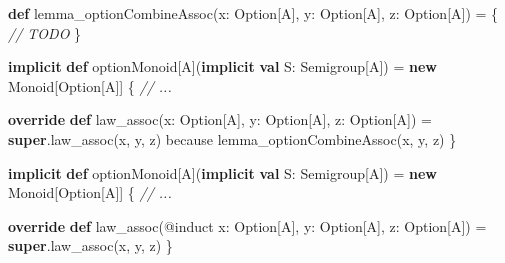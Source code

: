 \documentclass[
  ignorenonframetext,
]{beamer}
\newenvironment{Shaded}{}{}
\newcommand{\CommentTok}[1]{\textcolor[rgb]{0.38,0.63,0.69}{\textit{#1}}}
\newcommand{\FunctionTok}[1]{\textcolor[rgb]{0.02,0.16,0.49}{#1}}
\newcommand{\KeywordTok}[1]{\textcolor[rgb]{0.00,0.44,0.13}{\textbf{#1}}}
\newcommand{\NormalTok}[1]{#1}
\begin{document}
\begin{frame}[fragile]

\begin{Shaded}
\begin{Highlighting}[]
\KeywordTok{def} \FunctionTok{lemma_optionCombineAssoc}\NormalTok{(x: Option[A], y: Option[A], z: Option[A]) = \{}
  \CommentTok{// TODO}
\NormalTok{\}}
\end{Highlighting}
\end{Shaded}

\end{frame}

\begin{frame}[fragile]

\begin{Shaded}
\begin{Highlighting}[]
\KeywordTok{implicit} \KeywordTok{def}\NormalTok{ optionMonoid[A](}\KeywordTok{implicit} \KeywordTok{val}\NormalTok{ S: Semigroup[A]) =}
  \KeywordTok{new}\NormalTok{ Monoid[Option[A]] \{}
    \CommentTok{// ...}
    
    \KeywordTok{override} \KeywordTok{def} \FunctionTok{law_assoc}\NormalTok{(x: Option[A], y: Option[A], z: Option[A]) =}
      \KeywordTok{super}\NormalTok{.}\FunctionTok{law_assoc}\NormalTok{(x, y, z) because }\FunctionTok{lemma_optionCombineAssoc}\NormalTok{(x, y, z)}
\NormalTok{  \}  }
\end{Highlighting}
\end{Shaded}

\end{frame}

\begin{frame}[fragile]

\begin{Shaded}
\begin{Highlighting}[]
\KeywordTok{implicit} \KeywordTok{def}\NormalTok{ optionMonoid[A](}\KeywordTok{implicit} \KeywordTok{val}\NormalTok{ S: Semigroup[A]) =}
  \KeywordTok{new}\NormalTok{ Monoid[Option[A]] \{}
    \CommentTok{// ...}
    
    \KeywordTok{override} \KeywordTok{def} \FunctionTok{law_assoc}\NormalTok{(@induct x: Option[A], y: Option[A], z: Option[A]) =}
      \KeywordTok{super}\NormalTok{.}\FunctionTok{law_assoc}\NormalTok{(x, y, z)}
\NormalTok{  \}}
\end{Highlighting}
\end{Shaded}

\end{frame}
\end{document}
